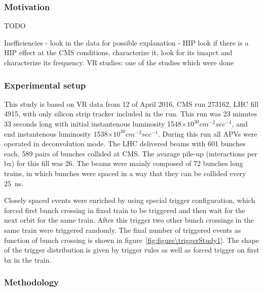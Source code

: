 \subsubsection{Motivation}

TODO

Inefficiencies - look in the data for possible explanation - HIP
look if there is a HIP effect at the CMS conditions, characterize it, look for its imapct and characterize its frequency.
VR studies: one of the studies which were done

\subsubsection{Experimental setup} 

This study is based on VR data from 12 of April 2016, CMS run 273162, LHC fill 4915, with only silicon strip tracker included in the run. This run was 23 minutes 33 seconds long with initial instantenous luminosity 1548$\times 10^{30} cm^{-2} sec^{-1}$, and end instantenous luminosity 1538$\times 10^{30} cm^{-2} sec^{-1}$. During this run all APVs were operated in deconvolution mode. The LHC delivered beams with 601 bunches each, 589 pairs of bunches collided at CMS. The avarage pile-up (interactions per bx) for this fill was 26. The beams were mainly composed of 72 bunches long trains, in which bunches were spaced in a way that they can be collided every 25~ns.

Closely spaced events were enriched by using special trigger configuration, which forced first bunch crossing in fixed train to be triggered and then wait for the next orbit for the same train. After this trigger two other bunch crossings in the same train were triggered randomly. The final number of triggered events as function of bunch crossing is shown in figure~\ref{fig:figure\triggerStudy1}. The shape of the trigger distribution is given by trigger rules as well as forced trigger on first bx in the train.



 \subsubsection{Methodology}
 

